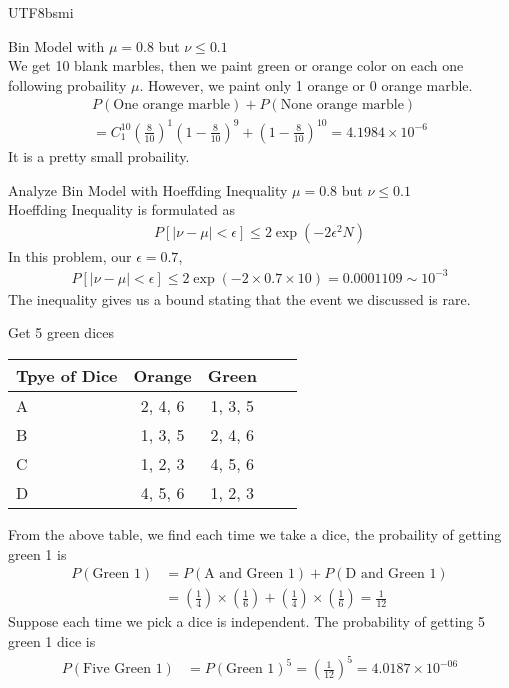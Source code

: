 \documentclass[12pt]{article}
\newcommand{\e}{\epsilon}
\newenvironment{prob}[2][Prob.]{\begin{trivlist}
\item[\hskip \labelsep {\bfseries #1}\hskip \labelsep {\bfseries #2}]}{\end{trivlist}}
\begin{document}
\begin{CJK}{UTF8}{bsmi}
\begin{prob}{11} Bin Model with $\mu = 0.8$ but $\nu \le 0.1$\\
We get 10 blank marbles, then we paint green or orange color on each one following probaility $\mu$.
However, we paint only 1 orange or 0 orange marble.
\begin{align*}
	P(\text{One orange marble}) + P(\text{None orange marble}) \\ 
	= C^{10}_{1} (\frac{8}{10})^1(1-\frac{8}{10})^9 + (1-\frac{8}{10})^{10} = 4.1984\times 10^{-6}
\end{align*}
It is a pretty small probaility.
\end{prob}

\begin{prob}{12} Analyze Bin Model with Hoeffding Inequality $\mu = 0.8$ but $\nu \le 0.1$ \\
	Hoeffding Inequality is formulated as 
	\begin{align*}
		P[|\nu-\mu| < \epsilon] \le 2\exp (-2\epsilon^2 N)
	\end{align*}
	In this problem, our $\e = 0.7$, 
	\begin{align*}
		P[|\nu-\mu| < \epsilon] \le 2\exp(-2\times 0.7 \times 10) = 0.0001109 \sim 10^{-3}
	\end{align*}
	The inequality gives us a bound stating that the event we discussed is rare.
\end{prob}

\begin{prob}{13} Get 5 green dices \\
\begin{center}
	\begin{tabular}{l*{3}{c}r}
	Tpye of Dice & Orange & Green \\
	\hline
	A & 2, 4, 6 & 1, 3, 5  \\
	B & 1, 3, 5 & 2, 4, 6  \\
	C & 1, 2, 3 & 4, 5, 6  \\
	D & 4, 5, 6 & 1, 2, 3  \\
	\end{tabular}
\end{center}
From the above table, we find each time we take a dice, the probaility of getting green 1 is 
\begin{align*}
	P(\text{Green 1}) &= P(\text{A and Green 1}) + P(\text{D and Green 1})\\
	&= (\frac{1}{4})\times(\frac{1}{6}) + (\frac{1}{4})\times(\frac{1}{6}) = \frac{1}{12}
\end{align*}
Suppose each time we pick a dice is independent. The probability of getting 5 green 1 dice is 
\begin{align*}
	P(\text{Five Green 1}) &= P(\text{Green 1})^5 = (\frac{1}{12})^5 = 4.0187 \times 10^{-06}
\end{align*}
\end{prob}


\end{CJK}
\end{document}
